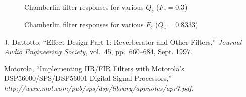 \documentclass[11pt]{handout}
\begin{document}
\begin{figure}[htb]
   \begin{center}
      \vspace*{0.5cm}
      \caption{Chamberlin filter responses for various $Q_c$ ($F_c=0.3$)}
      \label{fig:chamberlinQc}
   \end{center}
\end{figure}

\begin{figure}[htb]
   \begin{center}
      \vspace*{0.5cm}
      \caption{Chamberlin filter responses for various $F_c$ ($Q_c=0.8333$)}
      \label{fig:chamberlinFc}
   \end{center}
\end{figure}

\small
\ifx\undefined\allcaps{}\fi
\begin{thebibliography}{2}

J. Dattotto, ``Effect Design Part 1: Reverberator and Other Filters,'' 
{\em Journal Audio Engineering Society}, vol.~45, pp.~660--684, Sept. 1997.

Motorola, ``Implementing IIR/FIR Filters with Motorola's DSP56000/SPS/DSP56001 
Digital Signal Processors,'' 
{\em http://www.mot.com/pub/sps/dsp/library/appnotes/apr7.pdf}.

\end{thebibliography}
\end{document}
